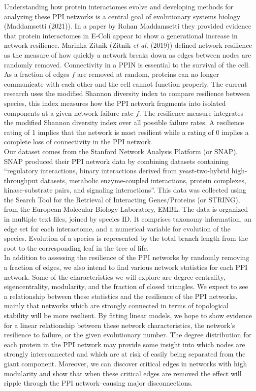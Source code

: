 \documentclass[12pt]{article}
\begin{document}
\indent Understanding how protein interactomes evolve and developing methods for analyzing these PPI networks is a central goal of evolutionary systems biology (Maddamsetti (2021)). In a paper by Rohan Maddamsetti they provided evidence that protein interactomes in E-Coli appear to show a generational increase in network resilience. Marinka Zitnik (Zitnik \textit{et al.} (2019)) defined network resilience as the measure of how quickly a network breaks down as edges between nodes are randomly removed. Connectivity in a PPIN is essential to the survival of the cell. As a fraction of edges $f$ are removed at random, proteins can no longer communicate with each other and the cell cannot function properly. The current research uses the modified Shannon diversity index to compare resilience between species, this index measures how the PPI network fragments into isolated components at a given network failure rate $f$. The resilience measure integrates the modified Shannon diversity index over all possible failure rates. A resilience rating of 1 implies that the network is most resilient while a rating of 0 implies a complete loss of connectivity in the PPI network. \\
\indent Our dataset comes from the Stanford Network Analysis Platform (or SNAP). SNAP produced their PPI network data by combining datasets containing “regulatory interactions, binary interactions derived from yeast-two-hybrid high-throughput datasets, metabolic enzyme-coupled interactions, protein complexes, kinase-substrate pairs, and signaling interactions”. This data was collected using the Search Tool for the Retrieval of Interacting Genes/Proteins (or STRING), from the European Molecular Biology Laboratory, EMBL. The data is organized in multiple text files, joined by species ID. It comprises taxonomy information, an edge set for each interactome, and a numerical variable for evolution of the species. Evolution of a species is represented by the total branch length from the root to the corresponding leaf in the tree of life. \\
\indent In addition to assessing the resilience of the PPI networks by randomly removing a fraction of edges, we also intend to find various network statistics for each PPI network. Some of the characteristics we will explore are degree centrality, eigencentrality, modularity, and the fraction of closed triangles. We expect to see a relationship between these statistics and the resilience of the PPI networks, mainly that networks which are strongly connected in terms of topological stability will be more resilient. By fitting linear models, we hope to show evidence for a linear relationship between these network characteristics, the network's resilience to failure, or the given evolutionary number. The degree distribution for each protein in the PPI network may provide some insight into which nodes are strongly interconnected and which are at risk of easily being separated from the giant component. Moreover, we can discover critical edges in networks with high modularity and show that when these critical edges are removed the effect will ripple through the PPI network--causing major disconnections. \\
\end{document}
